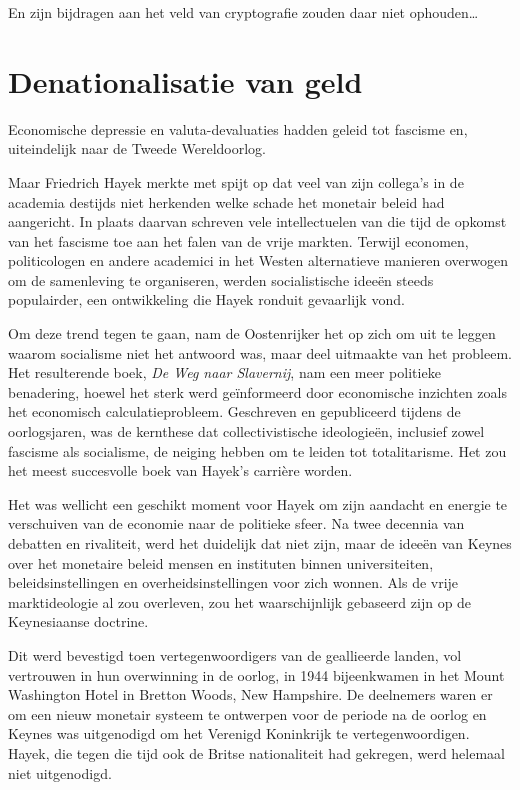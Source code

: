 \documentclass[smalldemyvopaper,11pt,twoside,onecolumn,openright,extrafontsizes,hidelinks]{memoir}
\begin{document}
En zijn bijdragen aan het veld van cryptografie zouden daar niet
ophouden\ldots{}

\chapter{Denationalisatie van geld}\label{denationalisatie-van-geld}

Economische depressie en valuta-devaluaties hadden geleid tot fascisme
en, uiteindelijk naar de Tweede Wereldoorlog.

Maar Friedrich Hayek merkte met spijt op dat veel van zijn collega's in
de academia destijds niet herkenden welke schade het monetair beleid had
aangericht. In plaats daarvan schreven vele intellectuelen van die tijd
de opkomst van het fascisme toe aan het falen van de vrije markten.
Terwijl economen, politicologen en andere academici in het Westen
alternatieve manieren overwogen om de samenleving te organiseren, werden
socialistische ideeën steeds populairder, een ontwikkeling die Hayek
ronduit gevaarlijk vond.

Om deze trend tegen te gaan, nam de Oostenrijker het op zich om uit te
leggen waarom socialisme niet het antwoord was, maar deel uitmaakte van
het probleem. Het resulterende boek, \emph{De Weg naar Slavernij}, nam
een meer politieke benadering, hoewel het sterk werd geïnformeerd door
economische inzichten zoals het economisch calculatieprobleem.
Geschreven en gepubliceerd tijdens de oorlogsjaren, was de kernthese dat
collectivistische ideologieën, inclusief zowel fascisme als socialisme,
de neiging hebben om te leiden tot totalitarisme. Het zou het meest
succesvolle boek van Hayek's carrière worden.

Het was wellicht een geschikt moment voor Hayek om zijn aandacht en
energie te verschuiven van de economie naar de politieke sfeer. Na twee
decennia van debatten en rivaliteit, werd het duidelijk dat niet zijn,
maar de ideeën van Keynes over het monetaire beleid mensen en instituten
binnen universiteiten, beleidsinstellingen en overheidsinstellingen voor
zich wonnen. Als de vrije marktideologie al zou overleven, zou het
waarschijnlijk gebaseerd zijn op de Keynesiaanse doctrine.

Dit werd bevestigd toen vertegenwoordigers van de geallieerde landen,
vol vertrouwen in hun overwinning in de oorlog, in 1944 bijeenkwamen in
het Mount Washington Hotel in Bretton Woods, New Hampshire. De
deelnemers waren er om een nieuw monetair systeem te ontwerpen voor de
periode na de oorlog en Keynes was uitgenodigd om het Verenigd
Koninkrijk te vertegenwoordigen. Hayek, die tegen die tijd ook de Britse
nationaliteit had gekregen, werd helemaal niet uitgenodigd.
\end{document}
